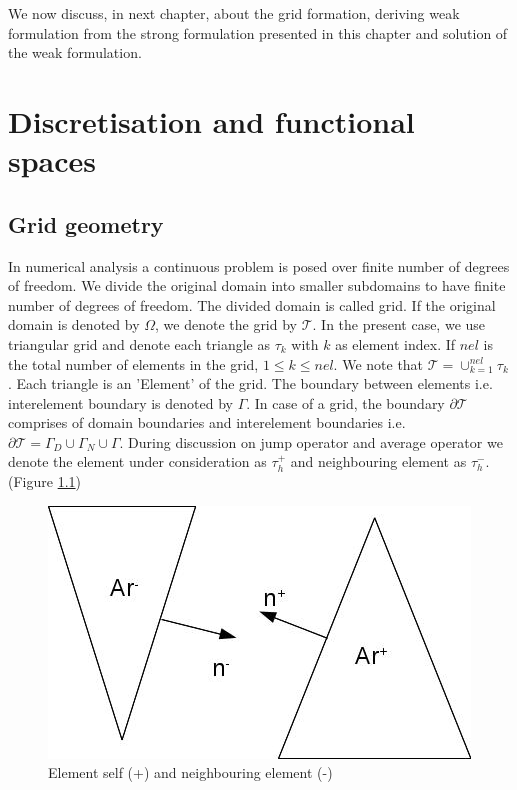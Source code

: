 \documentclass[a4paper,twoside,openright]{book}
\begin{document}
We now discuss, in next chapter, about the grid formation, deriving weak formulation from the strong formulation presented in this chapter and solution of the weak formulation.

\chapter{Discretisation and functional spaces}

\section{Grid geometry}

In numerical analysis a continuous problem is posed over finite number of degrees of freedom. We divide the original domain into smaller subdomains to have finite number of degrees of freedom. The divided domain is called grid. If the original domain is denoted by $\Omega$, we denote the grid by $\mathcal{T}$. In the present case, we use triangular grid and denote each triangle as $\tau_k$ with $k$ as element index. If $nel$ is the total number of elements in the grid, $1\leq k \leq nel$. We note that $\mathcal{T} = \cup_{k=1}^{nel} \tau_k$. Each triangle is an 'Element' of the grid. The boundary between elements i.e. interelement boundary is denoted by $\Gamma$. In case of a grid, the boundary $\partial \mathcal{T}$ comprises of domain boundaries and interelement boundaries i.e. $\partial \mathcal{T} = \Gamma_D \cup \Gamma_N \cup \Gamma$. During discussion on jump operator and average operator we denote the element under consideration as $\tau_{h}^+$ and neighbouring element as $\tau_{h}^-$. (Figure \ref{fig:Self_neighbour})

\begin{figure}
\centering
  \includegraphics[width=\linewidth]{ch_3_fig_1.jpg}
  \caption{Element self (+) and neighbouring element (-)}
  \label{fig:Self_neighbour}
\end{figure}
\end{document}
